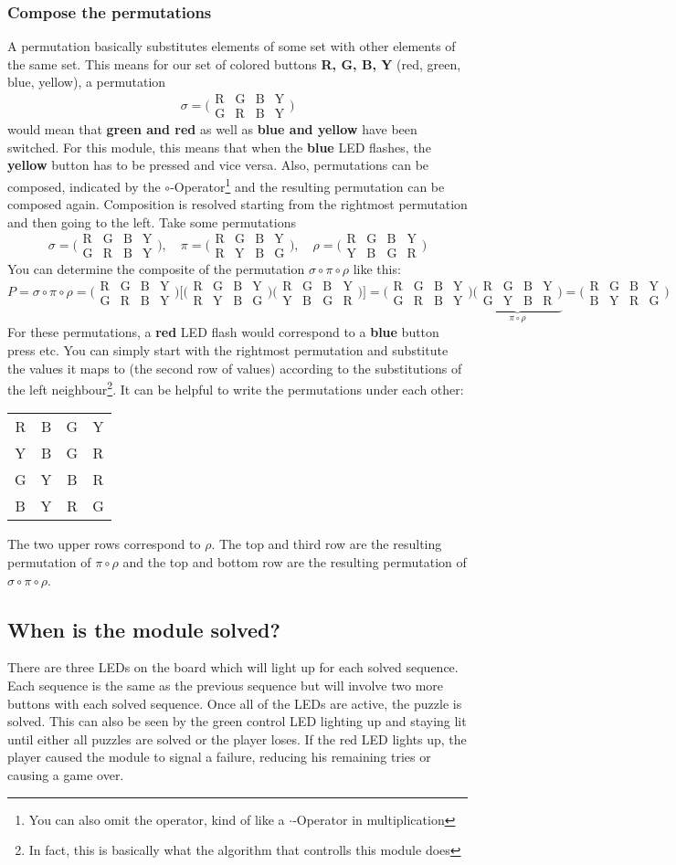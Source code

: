 \documentclass[a4paper]{article}
\newcommand{\perm}[4]{
	\bigl(\begin{smallmatrix}
		\mbox{R} & \mbox{G} & \mbox{B} & \mbox{Y} \\
		\mbox{#1}&\mbox{#2}&\mbox{#3}&\mbox{#4}
	\end{smallmatrix}\bigr)
}
\begin{document}
\subsubsection*{Compose the permutations}
A permutation basically substitutes elements of some set with other elements of the same set. This means for our set of colored buttons \textbf{R, G, B, Y} (red, green, blue, yellow), 
a permutation
\[
	\sigma = \perm{G}{R}{B}{Y}
\]
would mean that \textbf{green and red} as well as \textbf{blue and yellow} have been switched. For this module, this means that when the \textbf{blue} LED flashes, the \textbf{yellow}
button has to be pressed and vice versa. Also, permutations can be composed, indicated by the $\circ$-Operator\footnote{You can also omit the operator, kind of like a $\cdot$-Operator in multiplication} and the resulting permutation can be composed again. Composition is resolved starting from the rightmost permutation and then going to the left. Take some permutations
\[
	\sigma = \perm{G}{R}{B}{Y},\quad \pi = \perm{R}{Y}{B}{G}, \quad \rho  =\perm{Y}{B}{G}{R}
\]
You can determine the composite of the permutation $\sigma\circ\pi\circ\rho$ like this:
\[
	P=\sigma\circ\pi\circ\rho=\perm{G}{R}{B}{Y}\bigl[\perm{R}{Y}{B}{G}\perm{Y}{B}{G}{R}\bigr]=\perm{G}{R}{B}{Y}\underbrace{\perm{G}{Y}{B}{R}}_{\pi\circ\rho}=
		\perm{B}{Y}{R}{G}
\]
For these permutations, a \textbf{red} LED flash would correspond to a \textbf{blue} button press etc. You can simply start with the rightmost permutation and substitute the values it maps 
to (the second row of values) according to the substitutions of the left neighbour\footnote{In fact, this is basically what the algorithm that controlls this module does}. It can be helpful to write the permutations under each other:
\begin{table}[h]
\centering
\def\arraystretch{2}
 \begin{tabular}{cccc}
 R & B & G & Y \\
 Y & B & G & R \\
 G & Y & B & R \\
 B & Y & R & G
 \end{tabular}
 \end{table}

\noindent
The two upper rows correspond to $\rho$. The top and third row are the resulting permutation of $\pi\circ\rho$ and the top and bottom row are the resulting permutation of $\sigma\circ\pi\circ\rho$. 

\subsection*{When is the module solved?}
There are three LEDs on the board which will light up for each solved sequence. Each sequence is the same as the previous sequence but will involve two more buttons with each solved sequence. Once all of the LEDs are active, the puzzle is solved. This can also be seen by the green control LED lighting up and staying lit until either all puzzles are solved or the player loses.
If the red LED lights up, the player caused the module to signal a failure, reducing his remaining tries or causing a game over.
\end{document}
